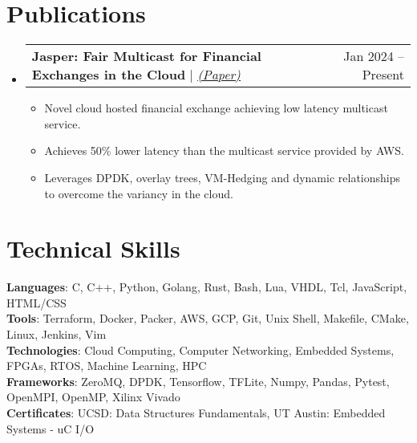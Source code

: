 \documentclass[letterpaper,11pt]{article}
\makeatletter
\newcommand{\resumeItem}[1]{
  \item\small{
    {#1 \vspace{-2pt}}
  }
}
\newcommand{\resumeProjectHeading}[2]{
    \item
    \begin{tabular*}{0.97\textwidth}{l@{\extracolsep{\fill}}r}
      \small#1 & #2 \\
    \end{tabular*}\vspace{-7pt}
}
\newcommand{\resumeSubHeadingListStart}{\begin{itemize}[leftmargin=0.15in, label={}]}
\newcommand{\resumeSubHeadingListEnd}{\end{itemize}}
\newcommand{\resumeItemListStart}{\begin{itemize}}
\newcommand{\resumeItemListEnd}{\end{itemize}\vspace{-5pt}}
\makeatother
\begin{document}
\section{Publications}
    \resumeSubHeadingListStart
        \resumeProjectHeading
          {\textbf{Jasper: Fair Multicast for Financial Exchanges in the Cloud} $|$ \emph{\href{https://dl.acm.org/doi/10.1145/3672202.3673728}{\underline{(Paper)}}}}{Jan 2024 -- Present}
          \resumeItemListStart
                \resumeItem{Novel cloud hosted financial exchange achieving low latency multicast service.}
                \resumeItem{Achieves 50\% lower latency than the multicast service provided by AWS. }
                \resumeItem{Leverages DPDK, overlay trees, VM-Hedging and dynamic relationships to overcome the variancy in the cloud.}
          \resumeItemListEnd
    \resumeSubHeadingListEnd

\section{Technical Skills}
 \begin{itemize}[leftmargin=0.15in, label={}]
    \small{\item{
    \textbf{Languages}{: C, C++, Python, Golang, Rust, Bash, Lua, VHDL, Tcl, JavaScript, HTML/CSS} \\
    \textbf{Tools}{: Terraform, Docker, Packer, AWS, GCP, Git, Unix Shell, Makefile, CMake, Linux, Jenkins, Vim} \\
    \textbf{Technologies}{: Cloud Computing, Computer Networking, Embedded Systems, FPGAs, RTOS, Machine Learning, HPC} \\
    \textbf{Frameworks}{: ZeroMQ, DPDK, Tensorflow, TFLite, Numpy, Pandas, Pytest, OpenMPI, OpenMP, Xilinx Vivado} \\
    \textbf{Certificates}{: UCSD: Data Structures Fundamentals, UT Austin: Embedded Systems - uC I/O} \\
    }}
 \end{itemize}

\vspace{-8.0pt}

\end{document}
